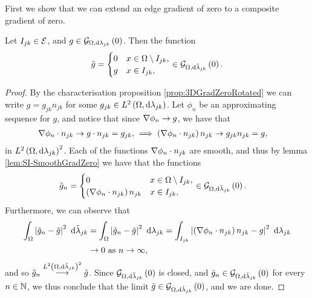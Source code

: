 First we show that we can extend an edge gradient of zero to a composite gradient of zero.
\begin{lemma} \label{lem:SI-GradZeroEdgeToComposite}
	Let $I_{jk}\in\mathcal{E}$, and $g\in\mathcal{G}_{ \Omega, \mathrm{d}\lambda_{jk}}\left( 0 \right)$.
	Then the function
	\begin{align*}
		\tilde{g} = \begin{cases} 0 & x\in\Omega\setminus I_{jk}, \\ g & x\in I_{jk}, \end{cases}
		\in\mathcal{G}_{ \Omega, \mathrm{d}\tilde{\lambda}_{jk}}\left( 0 \right).
	\end{align*}
\end{lemma}
\begin{proof}
	By the characterisation proposition \ref{prop:3DGradZeroRotated} we can write $g = g_{jk}n_{jk}$ for some $g_{jk}\in L^{2}\left( \Omega,\mathrm{d}\lambda_{jk} \right)$.
	Let $\phi_n$ be an approximating sequence for $g$, and notice that since $\nabla\phi_n\rightarrow g$, we have that
	\begin{align*}
		\nabla\phi_n\cdot n_{jk} \rightarrow g\cdot n_{jk} = g_{jk}, 
		&\implies
		\left(  \nabla\phi_n\cdot n_{jk}  \right)n_{jk} \rightarrow g_{jk}n_{jk} = g,
	\end{align*}
	in $L^{2}\left( \Omega,\mathrm{d}\lambda_{jk} \right)^2$.
	Each of the functions $\nabla\phi_n\cdot n_{jk}$ are smooth, and thus by lemma \ref{lem:SI-SmoothGradZero} we have that the functions
	\begin{align*}
		\tilde{g}_n &= \begin{cases} 0 & x\in\Omega\setminus I_{jk}, \\ \left(  \nabla\phi_n\cdot n_{jk}  \right)n_{jk} & x\in I_{jk}, \end{cases}
		\in\mathcal{G}_{ \Omega, \mathrm{d}\tilde{\lambda}_{jk}}\left( 0 \right).
	\end{align*}
	Furthermore, we can observe that
	\begin{align*}
		\int_{\Omega}\left\lvert  \tilde{g}_n - \tilde{g}  \right\rvert^2 \ \mathrm{d}\tilde{\lambda}_{jk}
		&= \int_{\Omega}\left\lvert  \tilde{g}_n - \tilde{g}  \right\rvert^2 \ \mathrm{d}\lambda_{jk}
		= \int_{I_{jk}}\left\lvert  \left(  \nabla\phi_n\cdot n_{jk}  \right)n_{jk} - g  \right\rvert^2 \ \mathrm{d}\lambda_{jk} \\
		&\rightarrow 0 \ \text{as} \ n \rightarrow\infty,
	\end{align*}
	and so $\tilde{g}_n\overset{L^{2}\left( \Omega,\mathrm{d}\tilde{\lambda}_{jk} \right)^2}{\longrightarrow}\tilde{g}$.
	Since $\mathcal{G}_{ \Omega, \mathrm{d}\tilde{\lambda}_{jk}}\left( 0 \right)$ is closed, and $\tilde{g}_n\in\mathcal{G}_{ \Omega, \mathrm{d}\tilde{\lambda}_{jk}}\left( 0 \right)$ for every $n\in\mathbb{N}$, we thus conclude that the limit $\tilde{g}\in\mathcal{G}_{ \Omega, \mathrm{d}\tilde{\lambda}_{jk}}\left( 0 \right)$, and we are done.
\end{proof}

